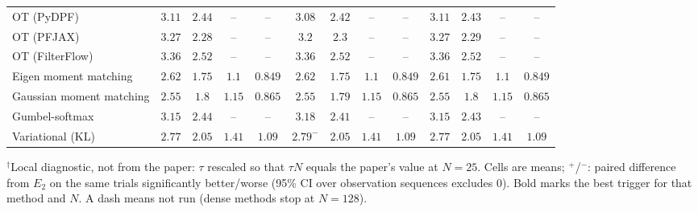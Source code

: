\begin{table}[ht]
\begin{adjustbox}{max width=\linewidth}
\begin{tabular}{lcccc|cccc|cccc}
OT (PyDPF) & $3.11$ & $2.44$ & -- & -- & $\mathbf{3.08}$ & $\mathbf{2.42}$ & -- & -- & $3.11$ & $2.43$ & -- & -- \\
OT (PFJAX) & $3.27$ & $\mathbf{2.28}$ & -- & -- & $\mathbf{3.2}$ & $2.3$ & -- & -- & $3.27$ & $2.29$ & -- & -- \\
OT (FilterFlow) & $3.36$ & $2.52$ & -- & -- & $\mathbf{3.36}$ & $\mathbf{2.52}$ & -- & -- & $3.36$ & $2.52$ & -- & -- \\
Eigen moment matching & $2.62$ & $1.75$ & $\mathbf{1.1}$ & $0.849$ & $2.62$ & $1.75$ & $1.1$ & $\mathbf{0.849}$ & $\mathbf{2.61}$ & $\mathbf{1.75}$ & $1.1$ & $0.849$ \\
Gaussian moment matching & $2.55$ & $1.8$ & $\mathbf{1.15}$ & $\mathbf{0.865}$ & $2.55$ & $\mathbf{1.79}$ & $1.15$ & $0.865$ & $\mathbf{2.55}$ & $1.8$ & $1.15$ & $\mathbf{0.865}$ \\
Gumbel-softmax & $\mathbf{3.15}$ & $2.44$ & -- & -- & $3.18$ & $\mathbf{2.41}$ & -- & -- & $3.15$ & $2.43$ & -- & -- \\
Variational (KL) & $2.77$ & $\mathbf{2.05}$ & $\mathbf{1.41}$ & $1.09$ & $2.79^{-}$ & $2.05$ & $1.41$ & $1.09$ & $\mathbf{2.77}$ & $2.05$ & $1.41$ & $\mathbf{1.09}$ \\
\bottomrule
\end{tabular}
\end{adjustbox}
\par\smallskip\parbox{0.95\linewidth}{\footnotesize $^\dagger$Local diagnostic, not from the paper: $\tau$ rescaled so that $\tau N$ equals the paper's value at $N{=}25$. Cells are means; $^{+}$/$^{-}$: paired difference from $E_2$ on the same trials significantly better/worse (95\% CI over observation sequences excludes 0). Bold marks the best trigger for that method and $N$. A dash means not run (dense methods stop at $N{=}128$).}
\end{table}

